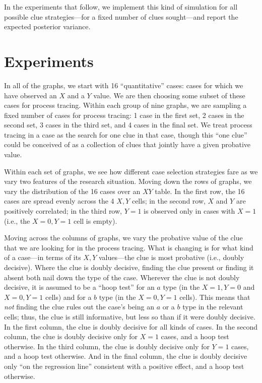 \documentclass[12pt,]{book}
\begin{document}
In the experiments that follow, we implement this kind of simulation for all possible clue strategies---for a fixed number of clues sought---and report the expected posterior variance.

\hypertarget{experiments}{%
\section{Experiments}\label{experiments}}

In all of the graphs, we start with 16 ``quantitative'' cases: cases for which we have observed an \(X\) and a \(Y\) value. We are then choosing some subset of these cases for process tracing. Within each group of nine graphs, we are sampling a fixed number of cases for process tracing: 1 case in the first set, 2 cases in the second set, 3 cases in the third set, and 4 cases in the final set. We treat process tracing in a case as the search for one clue in that case, though this ``one clue'' could be conceived of as a collection of clues that jointly have a given probative value.

Within each set of graphs, we see how different case selection strategies fare as we vary two features of the research situation. Moving down the rows of graphs, we vary the distribution of the 16 cases over an \(XY\) table. In the first row, the 16 cases are spread evenly across the 4 \(X,Y\) cells; in the second row, \(X\) and \(Y\) are positively correlated; in the third row, \(Y=1\) is observed only in cases with \(X=1\) (i.e., the \(X=0, Y=1\) cell is empty).

Moving across the columns of graphs, we vary the probative value of the clue that we are looking for in the process tracing. What is changing is for what kind of a case---in terms of its \(X,Y\) values---the clue is most probative (i.e., doubly decisive). Where the clue is doubly decisive, finding the clue present or finding it absent both nail down the type of the case. Wherever the clue is not doubly decisive, it is assumed to be a ``hoop test'' for an \(a\) type (in the \(X=1, Y=0\) and \(X=0, Y=1\) cells) and for a \(b\) type (in the \(X=0, Y=1\) cells). This means that \emph{not} finding the clue rules out the case's being an \(a\) or a \(b\) type in the relevant cells; thus, the clue is still informative, but less so than if it were doubly decisive. In the first column, the clue is doubly decisive for all kinds of cases. In the second column, the clue is doubly decisive only for \(X=1\) cases, and a hoop test otherwise. In the third column, the clue is doubly decisive only for \(Y=1\) cases, and a hoop test otherwise. And in the final column, the clue is doubly decisive only ``on the regression line'' consistent with a positive effect, and a hoop test otherwise.
\end{document}
